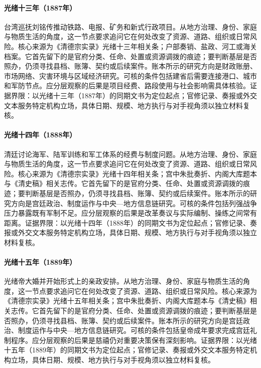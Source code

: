 \hypertarget{social:EQ-1887-TAIWAN-RAILWAY-PLANNING}{}\paragraph{光绪十三年（1887年）}台湾巡抚刘铭传推动铁路、电报、矿务和新式行政项目。从地方治理、身份、家庭与物质生活的角度，这一节点要求追问它在何处改变了资源、道路、组织或日常风险。核心来源为《清德宗实录》光绪十三年相关条；户部奏销、盐政、河工或海关档案。它首先留下的是官府分类、任命、处置或资源调拨的痕迹；要判断基层是否照办，仍须寻找县档、账簿、契约或后续案件。账本所示的研究方向是财政账册、市场网络、灾害环境与区域经济研究。可核的条件包括建省后需要连接港口、城市和军防节点。应分层观察的后果是项目经费、路段使用与社会影响需具体核验。证据界限：以光绪十三年（1887年）的同期文书为定位起点；官修记录、奏报或外交文本服务特定机构立场，具体日期、规模、地方执行与对手视角须以独立材料复核。
\hypertarget{social:EQ-1888-NAVAL-AND-ARMY-REFORM}{}\paragraph{光绪十四年（1888年）}清廷讨论海军、陆军训练和军工体系的经费与制度问题。从地方治理、身份、家庭与物质生活的角度，这一节点要求追问它在何处改变了资源、道路、组织或日常风险。核心来源为《清德宗实录》光绪十四年相关条；宫中朱批奏折、内阁大库题本与《清史稿》相关志传。它首先留下的是官府分类、任命、处置或资源调拨的痕迹；要判断基层是否照办，仍须寻找县档、账簿、契约或后续案件。账本所示的研究方向是宫廷政治、制度运作与中央—地方信息链研究。可核的条件包括列强战争压力暴露既有军制不足。应分层观察的后果是改革奏议与实际编制、操练之间常有距离。证据界限：以光绪十四年（1888年）的同期文书为定位起点；官修记录、奏报或外交文本服务特定机构立场，具体日期、规模、地方执行与对手视角须以独立材料复核。
\hypertarget{social:EQ-1889-GUANGXU-MARRIAGE}{}\paragraph{光绪十五年（1889年）}光绪帝大婚并开始形式上的亲政安排。从地方治理、身份、家庭与物质生活的角度，这一节点要求追问它在何处改变了资源、道路、组织或日常风险。核心来源为《清德宗实录》光绪十五年相关条；宫中朱批奏折、内阁大库题本与《清史稿》相关志传。它首先留下的是官府分类、任命、处置或资源调拨的痕迹；要判断基层是否照办，仍须寻找县档、账簿、契约或后续案件。账本所示的研究方向是宫廷政治、制度运作与中央—地方信息链研究。可核的条件包括皇帝成年要求完成宫廷礼制程序。应分层观察的后果是慈禧仍对重要决策保有深刻影响。证据界限：以光绪十五年（1889年）的同期文书为定位起点；官修记录、奏报或外交文本服务特定机构立场，具体日期、规模、地方执行与对手视角须以独立材料复核。
